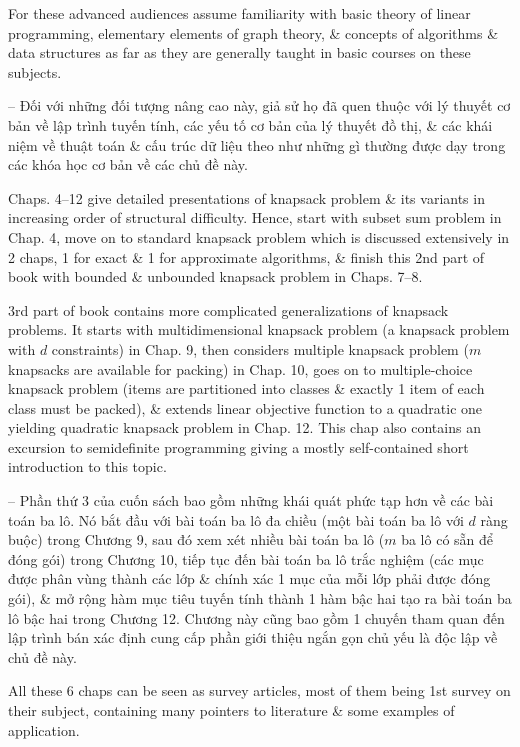 \documentclass{article}
\begin{document}
\begin{itemize}
    For these advanced audiences assume familiarity with basic theory of linear programming, elementary elements of graph theory, \& concepts of algorithms \& data structures as far as they are generally taught in basic courses on these subjects.

    -- Đối với những đối tượng nâng cao này, giả sử họ đã quen thuộc với lý thuyết cơ bản về lập trình tuyến tính, các yếu tố cơ bản của lý thuyết đồ thị, \& các khái niệm về thuật toán \& cấu trúc dữ liệu theo như những gì thường được dạy trong các khóa học cơ bản về các chủ đề này.

    Chaps. 4--12 give detailed presentations of knapsack problem \& its variants in increasing order of structural difficulty. Hence, start with subset sum problem in Chap. 4, move on to standard knapsack problem which is discussed extensively in 2 chaps, 1 for exact \& 1 for approximate algorithms, \& finish this 2nd part of book with bounded \& unbounded knapsack problem in Chaps. 7--8.

    3rd part of book contains more complicated generalizations of knapsack problems. It starts with multidimensional knapsack problem (a knapsack problem with $d$ constraints) in Chap. 9, then considers multiple knapsack problem ($m$ knapsacks are available for packing) in Chap. 10, goes on to multiple-choice knapsack problem (items are partitioned into classes \& exactly 1 item of each class must be packed), \& extends linear objective function to a quadratic one yielding quadratic knapsack problem in Chap. 12. This chap also contains an excursion to semidefinite programming giving a mostly self-contained short introduction to this topic.

    -- Phần thứ 3 của cuốn sách bao gồm những khái quát phức tạp hơn về các bài toán ba lô. Nó bắt đầu với bài toán ba lô đa chiều (một bài toán ba lô với $d$ ràng buộc) trong Chương 9, sau đó xem xét nhiều bài toán ba lô ($m$ ba lô có sẵn để đóng gói) trong Chương 10, tiếp tục đến bài toán ba lô trắc nghiệm (các mục được phân vùng thành các lớp \& chính xác 1 mục của mỗi lớp phải được đóng gói), \& mở rộng hàm mục tiêu tuyến tính thành 1 hàm bậc hai tạo ra bài toán ba lô bậc hai trong Chương 12. Chương này cũng bao gồm 1 chuyến tham quan đến lập trình bán xác định cung cấp phần giới thiệu ngắn gọn chủ yếu là độc lập về chủ đề này.

    All these 6 chaps can be seen as survey articles, most of them being 1st survey on their subject, containing many pointers to literature \& some examples of application.


\end{itemize}
\end{document}
